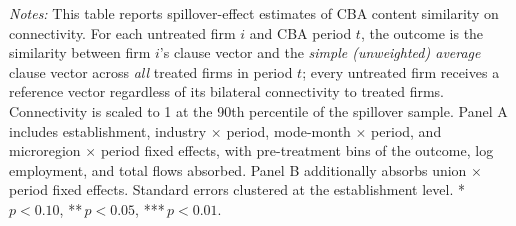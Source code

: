 \begin{table}[H]
\begin{minipage}{\linewidth}
\smallskip
\scriptsize\textit{Notes:} This table reports spillover-effect estimates of CBA content similarity on connectivity. For each untreated firm $i$ and CBA period $t$, the outcome is the similarity between firm $i$'s clause vector and the \emph{simple (unweighted) average} clause vector across \emph{all} treated firms in period $t$; every untreated firm receives a reference vector regardless of its bilateral connectivity to treated firms. Connectivity is scaled to 1 at the 90th percentile of the spillover sample. Panel A includes establishment, industry $\times$ period, mode-month $\times$ period, and microregion $\times$ period fixed effects, with pre-treatment bins of the outcome, log employment, and total flows absorbed. Panel B additionally absorbs union $\times$ period fixed effects. Standard errors clustered at the establishment level. *\,$p<0.10$, **\,$p<0.05$, ***\,$p<0.01$.
\end{minipage}
\end{table}
